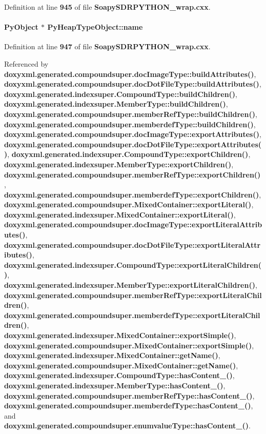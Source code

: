 Definition at line {\bf 945} of file {\bf Soapy\+S\+D\+R\+P\+Y\+T\+H\+O\+N\+\_\+wrap.\+cxx}.

\paragraph[{name}]{\setlength{\rightskip}{0pt plus 5cm}Py\+Object $\ast$ Py\+Heap\+Type\+Object\+::name}\label{structPyHeapTypeObject_a80a37a53a6216edf1744d7480eea2c3d}


Definition at line {\bf 947} of file {\bf Soapy\+S\+D\+R\+P\+Y\+T\+H\+O\+N\+\_\+wrap.\+cxx}.



Referenced by {\bf doxyxml.\+generated.\+compoundsuper.\+doc\+Image\+Type\+::build\+Attributes()}, {\bf doxyxml.\+generated.\+compoundsuper.\+doc\+Dot\+File\+Type\+::build\+Attributes()}, {\bf doxyxml.\+generated.\+indexsuper.\+Compound\+Type\+::build\+Children()}, {\bf doxyxml.\+generated.\+indexsuper.\+Member\+Type\+::build\+Children()}, {\bf doxyxml.\+generated.\+compoundsuper.\+member\+Ref\+Type\+::build\+Children()}, {\bf doxyxml.\+generated.\+compoundsuper.\+memberdef\+Type\+::build\+Children()}, {\bf doxyxml.\+generated.\+compoundsuper.\+doc\+Image\+Type\+::export\+Attributes()}, {\bf doxyxml.\+generated.\+compoundsuper.\+doc\+Dot\+File\+Type\+::export\+Attributes()}, {\bf doxyxml.\+generated.\+indexsuper.\+Compound\+Type\+::export\+Children()}, {\bf doxyxml.\+generated.\+indexsuper.\+Member\+Type\+::export\+Children()}, {\bf doxyxml.\+generated.\+compoundsuper.\+member\+Ref\+Type\+::export\+Children()}, {\bf doxyxml.\+generated.\+compoundsuper.\+memberdef\+Type\+::export\+Children()}, {\bf doxyxml.\+generated.\+compoundsuper.\+Mixed\+Container\+::export\+Literal()}, {\bf doxyxml.\+generated.\+indexsuper.\+Mixed\+Container\+::export\+Literal()}, {\bf doxyxml.\+generated.\+compoundsuper.\+doc\+Image\+Type\+::export\+Literal\+Attributes()}, {\bf doxyxml.\+generated.\+compoundsuper.\+doc\+Dot\+File\+Type\+::export\+Literal\+Attributes()}, {\bf doxyxml.\+generated.\+indexsuper.\+Compound\+Type\+::export\+Literal\+Children()}, {\bf doxyxml.\+generated.\+indexsuper.\+Member\+Type\+::export\+Literal\+Children()}, {\bf doxyxml.\+generated.\+compoundsuper.\+member\+Ref\+Type\+::export\+Literal\+Children()}, {\bf doxyxml.\+generated.\+compoundsuper.\+memberdef\+Type\+::export\+Literal\+Children()}, {\bf doxyxml.\+generated.\+indexsuper.\+Mixed\+Container\+::export\+Simple()}, {\bf doxyxml.\+generated.\+compoundsuper.\+Mixed\+Container\+::export\+Simple()}, {\bf doxyxml.\+generated.\+indexsuper.\+Mixed\+Container\+::get\+Name()}, {\bf doxyxml.\+generated.\+compoundsuper.\+Mixed\+Container\+::get\+Name()}, {\bf doxyxml.\+generated.\+indexsuper.\+Compound\+Type\+::has\+Content\+\_\+()}, {\bf doxyxml.\+generated.\+indexsuper.\+Member\+Type\+::has\+Content\+\_\+()}, {\bf doxyxml.\+generated.\+compoundsuper.\+member\+Ref\+Type\+::has\+Content\+\_\+()}, {\bf doxyxml.\+generated.\+compoundsuper.\+memberdef\+Type\+::has\+Content\+\_\+()}, and {\bf doxyxml.\+generated.\+compoundsuper.\+enumvalue\+Type\+::has\+Content\+\_\+()}.

